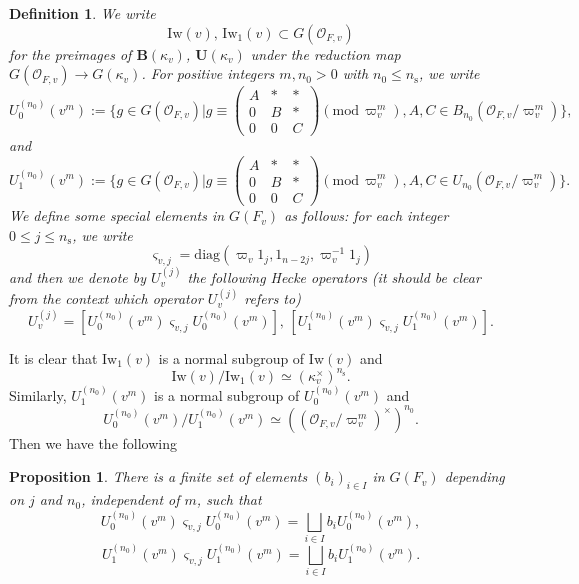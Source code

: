 \documentclass[12pt,oneside,reqno]{amsart}
\theoremstyle{plain}
\newtheorem{definition}[theorem]{Definition}
\newtheorem{proposition}[theorem]{Proposition}
\begin{document}
	\begin{definition}\label{Iwahori subgroups and the like}
		We write
		\[
		\mathrm{Iw}(v),\,
		\mathrm{Iw}_1(v)
		\subset
		G(\mathcal{O}_{F,v})
		\]
		for the preimages of
		$\mathbf{B}(\kappa_v)$,
		$\mathbf{U}(\kappa_v)$
		under the reduction map
		$G(\mathcal{O}_{F,v})
		\rightarrow
		G(\kappa_v)$.
		For positive integers
		$m,n_0>0$
		with
		$n_0\leq n_\mathrm{s}$,
		we write
		\[
		U_0^{(n_0)}(v^m)
		:=
		\Bigg\{
		g
		\in
		G(\mathcal{O}_{F,v})
		\bigg|
		g
		\equiv
		\begin{pmatrix}
			A & \ast & \ast \\
			0 & B & \ast \\
			0 & 0 & C
		\end{pmatrix}
		(\mathrm{mod}\,\varpi_v^m),
		A,C\in
		B_{n_0}
		(\mathcal{O}_{F,v}/\varpi_v^m)
		\Bigg\},
		\]
		and
		\[
		U_1^{(n_0)}(v^m)
		:=
		\Bigg\{
		g
		\in
		G(\mathcal{O}_{F,v})
		\bigg|
		g
		\equiv
		\begin{pmatrix}
			A & \ast & \ast \\
			0 & B & \ast \\
			0 & 0 & C
		\end{pmatrix}
		(\mathrm{mod}\,\varpi_v^m),
		A,C\in
		U_{n_0}
		(\mathcal{O}_{F,v}/\varpi_v^m)
		\Bigg\}.
		\]
		We define some special elements in
		$G(F_v)$
		as follows:
		for each integer
		$0\leq j\leq n_\mathrm{s}$,
		we write
		\[
		\varsigma_{v,j}
		=
		\mathrm{diag}
		(\varpi_v1_j,1_{n-2j},\varpi_v^{-1}1_j)
		\]
		and then we denote by $U_v^{(j)}$ the following Hecke operators (it should be clear from the context which operator $U_v^{(j)}$ refers to)
		\[
		U_v^{(j)}
		=
		[U_0^{(n_0)}(v^m)
		\varsigma_{v,j}
		U_0^{(n_0)}(v^m)],
		\,
		[U_1^{(n_0)}(v^m)
		\varsigma_{v,j}
		U_1^{(n_0)}(v^m)].
		\]
	\end{definition}
	It is clear that
	$\mathrm{Iw}_1(v)$
	is a normal subgroup of
	$\mathrm{Iw}(v)$
	and
	\[
	\mathrm{Iw}(v)/
	\mathrm{Iw}_1(v)
	\simeq
	(\kappa_v^\times)^{n_\mathrm{s}}.
	\]
	Similarly,
	$U_1^{(n_0)}(v^m)$
	is a normal subgroup of
	$U_0^{(n_0)}(v^m)$
	and
	\[
	U_0^{(n_0)}(v^m)/
	U_1^{(n_0)}(v^m)
	\simeq
	((\mathcal{O}_{F,v}/\varpi_v^m)^\times)^{n_0}.
	\]
	Then we have the following
	\begin{proposition}
		There is a finite set of elements
		$(b_i)_{i\in I}$ in $G(F_v)$
		depending on $j$ and $n_0$,
		independent of $m$,
		such that
		\[
		U_0^{(n_0)}(v^m)
		\varsigma_{v,j}
		U_0^{(n_0)}(v^m)
		=
		\bigsqcup_{i\in I}
		b_i
		U_0^{(n_0)}(v^m),
		\]
		\[
		U_1^{(n_0)}(v^m)
		\varsigma_{v,j}
		U_1^{(n_0)}(v^m)
		=
		\bigsqcup_{i\in I}
		b_i
		U_1^{(n_0)}(v^m).
		\]
	\end{proposition}
\end{document}
